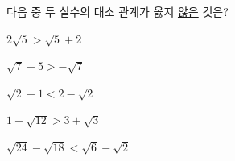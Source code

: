 다음 중 두 실수의 대소 관계가 옳지 \underline{않은} 것은?
\begin{choicesii}{\rule[-3ex]{0pt}{8ex}$2\sqrt{5}>\sqrt{5}+2$}{\rule[-3ex]{0pt}{8ex}$\sqrt{7}-5>-\sqrt{7}$}{\rule[-3ex]{0pt}{8ex}$\sqrt{2}-1<2-\sqrt{2}$}{\rule[-3ex]{0pt}{8ex}$1+\sqrt{12}>3+\sqrt{3}$}{\rule[-3ex]{0pt}{8ex}$\sqrt{24}-\sqrt{18}<\sqrt{6}-\sqrt{2}$}\end{choicesii}
